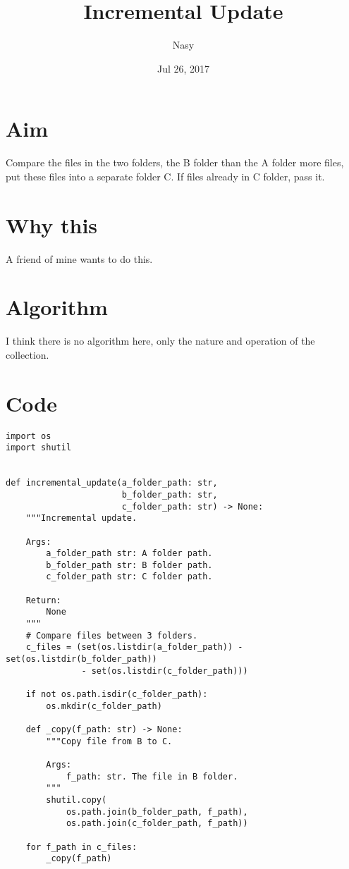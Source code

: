 \documentclass[11pt]{article}
\author{Nasy}
\date{Jul 26, 2017}
\title{Incremental Update}
\begin{document}
\maketitle

\section*{Aim}
\label{sec-1}
Compare the files in the two folders, the B folder than the A folder more files, put these files into a separate folder C. If files already in C folder, pass it.

\section*{Why this}
\label{sec-2}
A friend of mine wants to do this.

\section*{Algorithm}
\label{sec-3}
I think there is no algorithm here, only the nature and operation of the collection.

\section*{Code}
\label{sec-4}

\begin{verbatim}
import os
import shutil


def incremental_update(a_folder_path: str,
                       b_folder_path: str,
                       c_folder_path: str) -> None:
    """Incremental update.

    Args:
        a_folder_path str: A folder path.
        b_folder_path str: B folder path.
        c_folder_path str: C folder path.

    Return:
        None
    """
    # Compare files between 3 folders.
    c_files = (set(os.listdir(a_folder_path)) - set(os.listdir(b_folder_path))
               - set(os.listdir(c_folder_path)))

    if not os.path.isdir(c_folder_path):
        os.mkdir(c_folder_path)

    def _copy(f_path: str) -> None:
        """Copy file from B to C.

        Args:
            f_path: str. The file in B folder.
        """
        shutil.copy(
            os.path.join(b_folder_path, f_path),
            os.path.join(c_folder_path, f_path))

    for f_path in c_files:
        _copy(f_path)
\end{verbatim}
\end{document}

